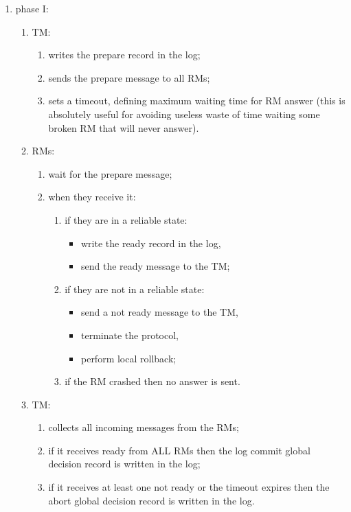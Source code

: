 \begin{enumerate}
	\item phase I:
	\begin{enumerate}
		\item TM:
		\begin{enumerate}
			\item writes the prepare record in the log;
			\item sends the prepare message to all RMs;
			\item sets a timeout, defining maximum waiting time for RM answer (this is absolutely useful for avoiding useless waste of time waiting some broken RM that will never answer).
		\end{enumerate}
		\item RMs:
		\begin{enumerate}
			\item wait for the prepare message;
			\item when they receive it:
			\begin{enumerate}
				\item if they are in a reliable state:
				\begin{itemize}
					\item write the ready record in the log,
					\item send the ready message to the TM;
				\end{itemize}
				\item if they are not in a reliable state:
				\begin{itemize}
					\item send a not ready message to the TM,
					\item terminate the protocol,
					\item perform local rollback;
				\end{itemize}
				\item if the RM crashed then no answer is sent.
			\end{enumerate}
		\end{enumerate}
		\item TM:
		\begin{enumerate}
			\item collects all incoming messages from the RMs;
			\item if it receives ready from ALL RMs then the log commit global decision record is written in the log;
			\item if it receives at least one not ready or the timeout expires then the abort global decision record is written in the log.

\end{enumerate}
\end{enumerate}
\end{enumerate}
